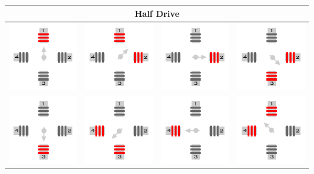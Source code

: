 \begin{table}[H]
\begin{tabular}{|cccc|}
		\hline
		\multicolumn{4}{|c|}{Half Drive} \\
		\hline
		\includegraphics[width = 0.15\columnwidth]{Images/AcionamentoDoHSM/Unipolar/HalfDrive/HalfDriveI.png} & \includegraphics[width = 0.15\columnwidth]{Images/AcionamentoDoHSM/Unipolar/HalfDrive/HalfDriveII.png} & \includegraphics[width = 0.15\columnwidth]{Images/AcionamentoDoHSM/Unipolar/HalfDrive/HalfDriveIII.png} & \includegraphics[width = 0.15\columnwidth]{Images/AcionamentoDoHSM/Unipolar/HalfDrive/HalfDriveIV.png} \\
		\includegraphics[width = 0.15\columnwidth]{Images/AcionamentoDoHSM/Unipolar/HalfDrive/HalfDriveV.png} & \includegraphics[width = 0.15\columnwidth]{Images/AcionamentoDoHSM/Unipolar/HalfDrive/HalfDriveVI.png} & \includegraphics[width = 0.15\columnwidth]{Images/AcionamentoDoHSM/Unipolar/HalfDrive/HalfDriveVII.png} & \includegraphics[width = 0.15\columnwidth]{Images/AcionamentoDoHSM/Unipolar/HalfDrive/HalfDriveVIII.png} \\			
		\hline
	\end{tabular}
\end{table}


